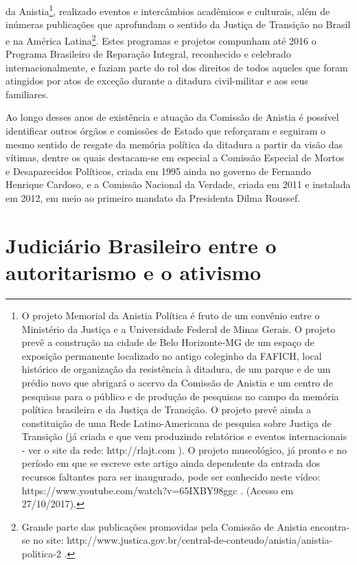 da Anistia\footnote{O projeto Memorial da Anistia Política é fruto de um
  convênio entre o Ministério da Justiça e a Universidade Federal de
  Minas Gerais. O projeto prevê a construção na cidade de Belo
  Horizonte-MG de um espaço de exposição permanente localizado no antigo
  coleginho da FAFICH, local histórico de organização da resistência à
  ditadura, de um parque e de um prédio novo que abrigará o acervo da
  Comissão de Anistia e um centro de pesquisas para o público e de
  produção de pesquisas no campo da memória política brasileira e da
  Justiça de Transição. O projeto prevê ainda a constituição de uma Rede
  Latino-Americana de pesquisa sobre Justiça de Transição (já criada e
  que vem produzindo relatórios e eventos internacionais - ver o site da
  rede: http://rlajt.com ). O projeto museológico, já pronto e no
  período em que se escreve este artigo ainda dependente da entrada dos
  recursos faltantes para ser inaugurado, pode ser conhecido neste
  vídeo: https://www.youtube.com/watch?v=65IXBY98ggc . (Acesso em
  27/10/2017).}, realizado eventos e intercâmbios acadêmicos e
culturais, além de inúmeras publicações que aprofundam o sentido da
Justiça de Transição no Brasil e na América Latina\footnote{Grande parte
  das publicações promovidas pela Comissão de Anistia encontra-se no
  site:
  http://www.justica.gov.br/central-de-conteudo/anistia/anistia-politica-2
  .}. Estes programas e projetos compunham até 2016 o Programa
Brasileiro de Reparação Integral, reconhecido e celebrado
internacionalmente, e faziam parte do rol dos direitos de todos aqueles
que foram atingidos por atos de exceção durante a ditadura civil-militar
e aos seus familiares.

Ao longo desses anos de existência e atuação da Comissão de Anistia é
possível identificar outros órgãos e comissões de Estado que reforçaram
e seguiram o mesmo sentido de resgate da memória política da ditadura a
partir da visão das vítimas, dentre os quais destacam-se em especial a
Comissão Especial de Mortos e Desaparecidos Políticos, criada em 1995
ainda no governo de Fernando Henrique Cardoso, e a Comissão Nacional da
Verdade, criada em 2011 e instalada em 2012, em meio ao primeiro mandato
da Presidenta Dilma Roussef.

\section{Judiciário Brasileiro entre o autoritarismo e o ativismo}

